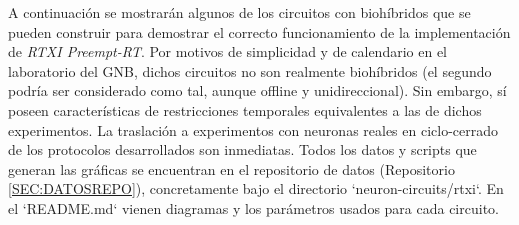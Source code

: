 
A continuación se mostrarán algunos de los circuitos con biohíbridos que se pueden construir para demostrar el correcto funcionamiento de la implementación de \textit{RTXI Preempt-RT}. Por motivos de simplicidad y de calendario en el laboratorio del GNB, dichos circuitos no son realmente biohíbridos (el segundo podría ser considerado como tal, aunque offline y unidireccional). Sin embargo, sí poseen características de restricciones temporales equivalentes a las de dichos experimentos. La traslación a experimentos con neuronas reales en ciclo-cerrado de los protocolos desarrollados son inmediatas. Todos los datos y scripts que generan las gráficas se encuentran en el repositorio de datos (Repositorio \ref{SEC:DATOSREPO}), concretamente bajo el directorio `neuron-circuits/rtxi`. En el `README.md` vienen diagramas y los parámetros usados para cada circuito.
